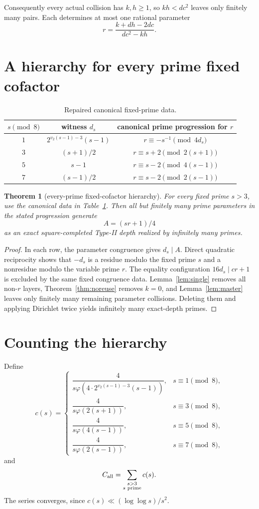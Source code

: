 \documentclass[11pt]{article}
\newtheorem{theorem}{Theorem}
\theoremstyle{definition}
\begin{document}
Consequently every actual collision has $k,h\ge1$, so $kh<dc^2$ leaves only finitely many pairs. Each determines at most one rational parameter
\[
r=\frac{k+dh-2dc}{dc^2-kh}.
\]

\section{A hierarchy for every prime fixed cofactor}
\begin{table}[h]
\centering
\begin{tabular}{c|c|c}
$s\pmod8$ & witness $d_s$ & canonical prime progression for $r$ \\
\hline
$1$ & $2^{v_2(s-1)-3}(s-1)$ & $r\equiv-s^{-1}\pmod{4d_s}$ \\
$3$ & $(s+1)/2$ & $r\equiv s+2\pmod{2(s+1)}$ \\
$5$ & $s-1$ & $r\equiv s-2\pmod{4(s-1)}$ \\
$7$ & $(s-1)/2$ & $r\equiv s-2\pmod{2(s-1)}$
\end{tabular}
\caption{Repaired canonical fixed-prime data.}
\label{tab:canonical}
\end{table}

\begin{theorem}[every-prime fixed-cofactor hierarchy]\label{thm:allprime}
For every fixed prime $s>3$, use the canonical data in Table~\ref{tab:canonical}. Then all but finitely many prime parameters in the stated progression generate
\[
\boxed{A=(sr+1)/4}
\]
as an exact square-completed Type-II depth realized by infinitely many primes.
\end{theorem}

\begin{proof}
In each row, the parameter congruence gives $d_s\mid A$. Direct quadratic reciprocity shows that $-d_s$ is a residue modulo the fixed prime $s$ and a nonresidue modulo the variable prime $r$. The equality configuration $16d_s\mid cr+1$ is excluded by the same fixed congruence data. Lemma~\ref{lem:single} removes all non-$r$ layers, Theorem~\ref{thm:noreuse} removes $k=0$, and Lemma~\ref{lem:master} leaves only finitely many remaining parameter collisions. Deleting them and applying Dirichlet twice yields infinitely many exact-depth primes.
\end{proof}

\section{Counting the hierarchy}
Define
\[
c(s)=
\begin{cases}
\dfrac{4}{s\varphi(4\cdot2^{v_2(s-1)-3}(s-1))},&s\equiv1\pmod8,\\[7pt]
\dfrac{4}{s\varphi(2(s+1))},&s\equiv3\pmod8,\\[7pt]
\dfrac{4}{s\varphi(4(s-1))},&s\equiv5\pmod8,\\[7pt]
\dfrac{4}{s\varphi(2(s-1))},&s\equiv7\pmod8,
\end{cases}
\]
and
\[
C_{\rm all}=\sum_{\substack{s>3\\s\text{ prime}}}c(s).
\]
The series converges, since $c(s)\ll (\log\log s)/s^2$.
\end{document}
